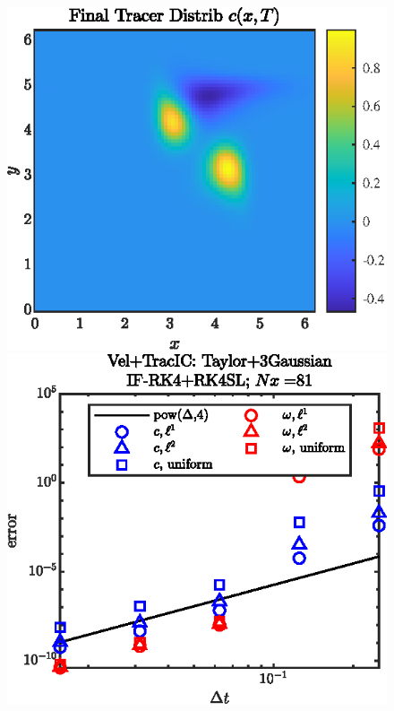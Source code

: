 \documentclass[11pt,letterpaper]{article}
\begin{document}
\begin{figure}[H]
    \centering
    \includegraphics{figs/NSAdv_c_final_Taylor_3Gaussian}
    \includegraphics{figs/NSAdv_conv_order_Taylor_3Gaussian}
    \caption{}\label{fig:NSAdv_c_final_Taylor_3Gaussian}
\end{figure}
\end{document}
